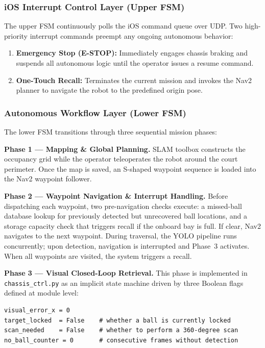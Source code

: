 \subsubsection{iOS Interrupt Control Layer (Upper FSM)}

The upper FSM continuously polls the iOS command queue over UDP. Two high-priority interrupt commands preempt any ongoing autonomous behavior:

\begin{enumerate}
  \item \textbf{Emergency Stop (E-STOP):} Immediately engages chassis braking and suspends all autonomous logic until the operator issues a resume command.
  \item \textbf{One-Touch Recall:} Terminates the current mission and invokes the Nav2 planner to navigate the robot to the predefined origin pose.
\end{enumerate}

\subsubsection{Autonomous Workflow Layer (Lower FSM)}

The lower FSM transitions through three sequential mission phases:

\textbf{Phase 1 --- Mapping \& Global Planning.}
SLAM toolbox constructs the occupancy grid while the operator teleoperates the robot around the court perimeter. Once the map is saved, an S-shaped waypoint sequence is loaded into the Nav2 waypoint follower.

\textbf{Phase 2 --- Waypoint Navigation \& Interrupt Handling.}
Before dispatching each waypoint, two pre-navigation checks execute: a missed-ball database lookup for previously detected but unrecovered ball locations, and a storage capacity check that triggers recall if the onboard bay is full. If clear, Nav2 navigates to the next waypoint. During traversal, the YOLO pipeline runs concurrently; upon detection, navigation is interrupted and Phase~3 activates. When all waypoints are visited, the system triggers a recall.

\textbf{Phase 3 --- Visual Closed-Loop Retrieval.}
This phase is implemented in \texttt{chassis\_ctrl.py} as an implicit state machine driven by three Boolean flags defined at module level:

\begin{verbatim}
visual_error_x = 0
target_locked  = False    # whether a ball is currently locked
scan_needed    = False    # whether to perform a 360-degree scan
no_ball_counter = 0       # consecutive frames without detection
\end{verbatim}

